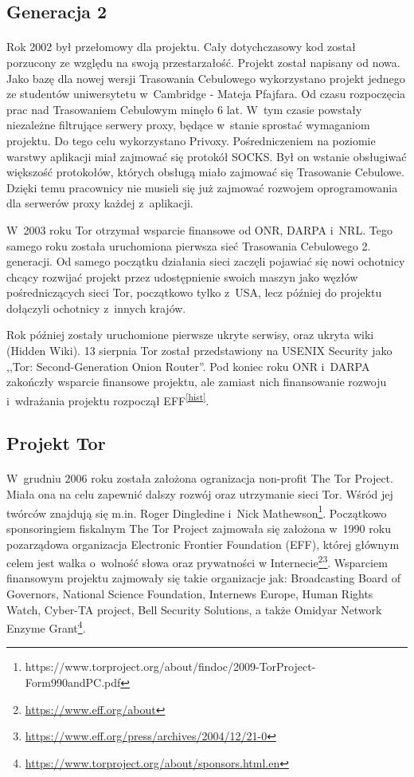 \subsection{Generacja 2}\paragraph{}
Rok 2002 był przełomowy dla projektu. Cały dotychczasowy kod został porzucony ze względu na swoją przestarzałość. Projekt został napisany od nowa. Jako bazę dla nowej wersji Trasowania Cebulowego wykorzystano projekt jednego ze studentów uniwersytetu w~Cambridge - Mateja Pfajfara. Od czasu rozpoczęcia prac nad Trasowaniem Cebulowym minęło 6 lat. W~tym czasie powstały niezależne filtrujące serwery proxy, będące w~stanie sprostać wymaganiom projektu. Do tego celu wykorzystano Privoxy. Pośredniczeniem na poziomie warstwy aplikacji miał zajmować się protokół SOCKS. Był on wstanie obsługiwać większość protokołów, których obsługą miało zajmować się Trasowanie Cebulowe. Dzięki temu pracownicy nie musieli się już zajmować rozwojem oprogramowania dla serwerów proxy każdej z~aplikacji. 

W~2003 roku Tor otrzymał wsparcie finansowe od ONR, DARPA i~NRL. Tego samego roku została uruchomiona pierwsza sieć Trasowania Cebulowego 2. generacji. Od samego początku działania sieci zaczęli pojawiać się nowi ochotnicy chcący rozwijać projekt przez udostępnienie swoich maszyn jako węzłów pośredniczących sieci Tor, początkowo tylko z~USA, lecz później do projektu dołączyli ochotnicy z~innych krajów. 

Rok później zostały uruchomione pierwsze ukryte serwisy, oraz ukryta wiki (Hidden Wiki). 13 sierpnia Tor został przedstawiony na USENIX Security jako ,,Tor: Second-Generation Onion Router''. Pod koniec roku ONR i~DARPA zakończły wsparcie finansowe projektu, ale zamiast nich finansowanie rozwoju i~wdrażania projektu rozpoczął EFF\textsuperscript{\ref{hist}}.

\subsection{Projekt Tor}\paragraph{}
\indent W~grudniu 2006 roku została założona ogranizacja non-profit The Tor Project. Miała ona na celu zapewnić dalszy rozwój oraz utrzymanie sieci Tor. Wśród jej twórców znajdują się m.in. Roger Dingledine i~Nick Mathewson\footnote{https://www.torproject.org/about/findoc/2009-TorProject-Form990andPC.pdf}. Początkowo sponsoringiem fiskalnym The Tor Project zajmowała się założona w~1990 roku pozarządowa organizacja Electronic Frontier Foundation (EFF), której głównym celem jest walka o~wolność słowa oraz prywatności w Internecie\footnote{\url{https://www.eff.org/about}}\footnote{\url{https://www.eff.org/press/archives/2004/12/21-0}}. Wsparciem finansowym projektu zajmowały się takie organizacje jak: Broadcasting Board of Governors, National Science Foundation, Internews Europe, Human Rights Watch, Cyber-TA project, Bell Security Solutions, a także Omidyar Network Enzyme Grant\footnote{\url{https://www.torproject.org/about/sponsors.html.en}}.


